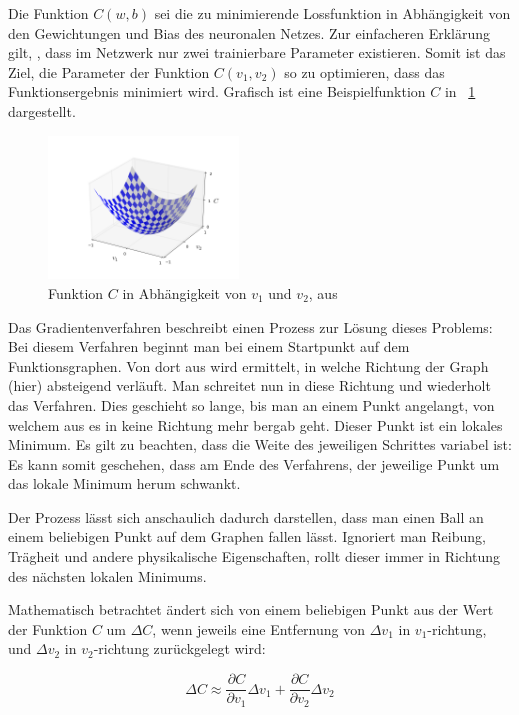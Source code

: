 Die Funktion $C(w, b)$ sei die zu minimierende Lossfunktion in Abhängigkeit von den Gewichtungen und Bias des neuronalen Netzes. Zur einfacheren Erklärung gilt, \oBdA, dass im Netzwerk nur zwei trainierbare Parameter existieren. Somit ist das Ziel, die Parameter der Funktion $C(v_1, v_2)$ so zu optimieren, dass das Funktionsergebnis minimiert wird. Grafisch ist eine Beispielfunktion $C$ in \figurename~\ref{fig:valley} dargestellt.

\begin{figure}[h!]
	\centering
	\includegraphics[width=0.45\textwidth,keepaspectratio]{images/Nie15/Nie15_01.png}
	\caption{Funktion $C$ in Abhängigkeit von $v_1$ und $v_2$, aus \cite[Kap.~1]{nielsen_15}}
	\label{fig:valley}
\end{figure}

Das Gradientenverfahren beschreibt einen Prozess zur Lösung dieses Problems: Bei diesem Verfahren beginnt man bei einem Startpunkt auf dem Funktionsgraphen. Von dort aus wird ermittelt, in welche Richtung der Graph (hier) absteigend verläuft. Man schreitet nun in diese Richtung und wiederholt das Verfahren. Dies geschieht so lange, bis man an einem Punkt angelangt, von welchem aus es in keine Richtung mehr bergab geht. Dieser Punkt ist ein lokales Minimum. Es gilt zu beachten, dass die Weite des jeweiligen Schrittes variabel ist: Es kann somit geschehen, dass am Ende des Verfahrens, der jeweilige Punkt um das lokale Minimum herum schwankt.

Der Prozess lässt sich anschaulich dadurch darstellen, dass man einen Ball an einem beliebigen Punkt auf dem Graphen fallen lässt. Ignoriert man Reibung, Trägheit und andere physikalische Eigenschaften, rollt dieser immer in Richtung des nächsten lokalen Minimums.

Mathematisch betrachtet ändert sich von einem beliebigen Punkt aus der Wert der Funktion $C$ um $\Delta C$, wenn jeweils eine Entfernung von $\Delta v_1$ in $v_1$-richtung, und $\Delta v_2$ in $v_2$-richtung zurückgelegt wird: \cite[Kap.~1]{nielsen_15}

\begin{equation}
\label{eqn:def_deltaC}
\Delta C\approx \frac{\partial C}{\partial v_1}\Delta v_1 + \frac{\partial C}{\partial v_2}\Delta v_2
\end{equation}

